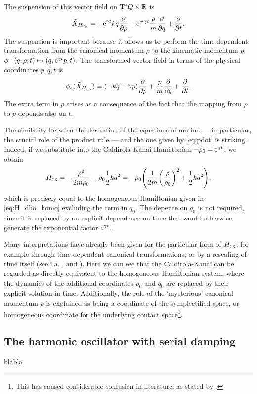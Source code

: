 The suspension of this vector field on $\mathrm{T}^*Q\times \mathbb{R}$ is
$$ \tilde{X}_{H_\text{\tiny{\textsc{CK}}}} = -\mathrm{e}^{\gamma t}kq\pdv{}{\ensuremath{\rho}} + \mathrm{e}^{-\gamma t}\frac{\rho}{m}\pdv{}{q} + \pdv{}{t}.$$
The suspension is important because it allows us to perform the time-dependent transformation from the canonical momentum $\rho$ to the kinematic momentum $p$:
$\phi: (q, \rho, t) \mapsto (q, \mathrm{e}^{\gamma t}p, t).$
The transformed vector field in terms of the physical coordinates $p, q, t$ is
$$ \phi_*(\tilde{X}_{H_\text{\tiny{\textsc{CK}}}}) = \qty(-kq - \gamma p)\pdv{}{p} + \frac{p}{m}\pdv{}{q} + \pdv{}{t}.$$
The extra term in $p$ arises as a consequence of the fact that the mapping from $\rho$ to $p$ depends also on $t$. 

The similarity between the derivation of the equations of motion --- in particular, the crucial role of the product rule --- and the one given by \cref{eq:pdot} is striking. Indeed, if we substitute into the Caldirola-Kanai Hamiltonian $-\rho_0 = \mathrm{e}^{\gamma t}$, we obtain
$$ H_\text{\tiny{\textsc{CK}}} = -\frac{\rho^2}{2m\rho_0} - \rho_0 \frac{1}{2}kq^2 = -\rho_0 \qty (\frac{1}{2m}\qty(\frac{\rho}{\rho_0})^2 + \frac{1}{2}kq^2), $$
which is precisely equal to the homogeneous Hamiltonian given in \cref{eq:H_dho_homo} excluding the term in $q_0$. The depence on $q_0$ is not required, since it is replaced by an explicit dependence on time that would otherwise generate the exponential factor $\mathrm{e}^{\gamma t}$. 

Many interpretations have already been given for the particular form of $H_\text{\tiny{\textsc{CK}}}$; for example through time-dependent canonical transformations, or by a rescaling of time itself (see i.a. \citet{Tokieda2021}, \citet{Caldirola1941} and \citet{Bravetti2017}). Here we can see that the Caldirola-Kanai can be regarded as  directly equivalent to the homogeneous Hamiltonian system, where the dynamics of the additional coordinates $\rho_0$ and $q_0$ are replaced by their explicit solution in time. Additionally, the role of the `mysterious' canonical momentum $\rho$ is explained as being a coordinate of the symplectified space, or homogeneous coordinate for the underlying contact space\footnote{This has caused considerable confusion in literature, as stated by \citet{Schuch1997}.}.

\subsection{The harmonic oscillator with serial damping}
blabla
